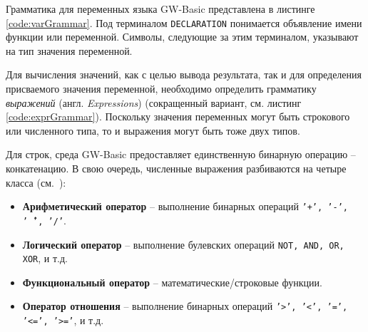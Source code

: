 \documentclass[12pt]{article}
\begin{document}
				\indent Грамматика для переменных языка GW-Basic представлена в листинге \ref{code:varGrammar}. Под терминалом {\tt DECLARATION} понимается объявление имени функции или переменной. Символы, следующие за этим терминалом, указывают на тип значения переменной.
				
				
				\indent Для вычисления значений, как с целью вывода результата, так и для определения присваемого значения переменной, необходимо определить грамматику {\it выражений} (англ. {\it Expressions}) (сокращенный вариант, см. листинг \ref{code:exprGrammar}). Поскольку значения переменных могут быть строкового или численного типа, то и выражения могут быть тоже двух типов. 
				
				

				\indent Для строк, среда GW-Basic предоставляет единственную бинарную операцию -- конкатенацию. В свою очередь, численные выражения разбиваются на четыре класса (см.~\cite[стр.~46]{basicManual}):
				\begin{itemize}
					\item {\bf Арифметический оператор} -- выполнение бинарных операций {\tt '+', '-', '\^\ ', '/'}.
					\item {\bf Логический оператор} -- выполнение булевских операций {\tt NOT, AND, OR, XOR}, и т.д. 
					\item {\bf Функциональный оператор} -- математические/строковые функции.
					\item {\bf Оператор отношения} -- выполнение бинарных операций {\tt '>', '<', '=', '<=', '>='}, и т.д.
				\end{itemize}
\end{document}
